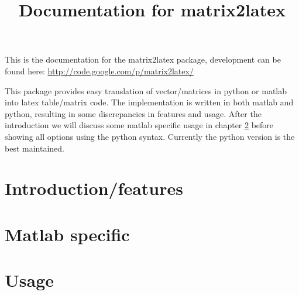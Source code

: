 




\title{Documentation for matrix2latex}


\maketitle
This is the documentation for the matrix2latex package, development can be found here:
\url{http://code.google.com/p/matrix2latex/}

This package provides easy translation of vector/matrices in python or matlab into latex table/matrix code.
The implementation is written in both matlab and python, resulting in some discrepancies in features and usage.
After the introduction we will discuss some
matlab specific usage in chapter \ref{sec:matlab} before showing
all options using the python syntax. Currently the python version is the best maintained.
\chapter{Introduction/features}
\label{sec:introduction}


\chapter{Matlab specific}
\label{sec:matlab}


\chapter{Usage}
\label{sec:python}


 
